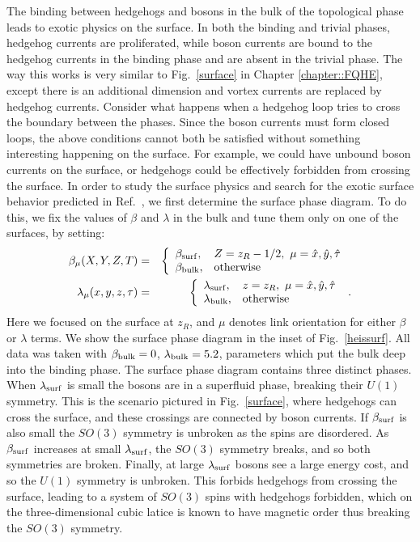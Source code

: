 The binding between hedgehogs and bosons in the bulk of the topological phase leads to exotic physics on the surface. In both the binding and trivial phases, hedgehog currents are proliferated, while boson currents are bound to the hedgehog currents in the binding phase and are absent in the trivial phase. The way this works is very similar to Fig.~\ref{surface} in Chapter \ref{chapter::FQHE}, except there is an additional dimension and vortex currents are replaced by hedgehog currents. Consider what happens when a hedgehog loop tries to cross the boundary between the phases. Since the boson currents must form closed loops, the above conditions cannot both be satisfied without something interesting happening on the surface. For example, we could have unbound boson currents on the surface, or hedgehogs could be effectively forbidden from crossing the surface.
In order to study the surface physics and search for the exotic surface behavior predicted in Ref.~\cite{SenthilVishwanath}, we first determine the surface phase diagram.
To do this, we fix the values of $\beta$ and $\lambda$ in the bulk and tune them only on one of the surfaces, by setting:
\begin{eqnarray}
\beta_\mu(X,Y,Z,T) &=&
\left\{
\begin{array}{ll}
\beta_{\rm surf}, & Z = z_R - 1/2, ~\mu=\hat{x},\hat{y},\hat{\tau}\\
\beta_{\rm bulk}, & {\rm otherwise}
\end{array}\right. ~
\label{bulkvsurf} \\
\lambda_\mu(x,y,z,\tau) &=&
\left\{
\begin{array}{ll}
\lambda_{\rm surf}, & z = z_R, ~\mu=\hat{x},\hat{y},\hat{\tau}\\
\lambda_{\rm bulk}, & {\rm otherwise }
\end{array}\right. ~.
\end{eqnarray}
Here we focused on the surface at $z_R$, and $\mu$ denotes link orientation for either $\beta$ or $\lambda$ terms.  We show the surface phase diagram in the inset of Fig.~\ref{heissurf}.  All data was taken with $\beta_{\rm bulk}=0$, $\lambda_{\rm bulk}=5.2$, parameters which put the bulk deep into the binding phase.  The surface phase diagram contains three distinct phases. When $\lambda_{\rm surf}$ is small the bosons are in a superfluid phase, breaking their $U(1)$ symmetry. This is the scenario pictured in Fig.~\ref{surface}, where hedgehogs can cross the surface, and these crossings are connected by boson currents. If $\beta_{\rm surf}$ is also small the $SO(3)$ symmetry is unbroken as the spins are disordered. As $\beta_{\rm surf}$ increases at small $\lambda_{\rm surf}$, the $SO(3)$ symmetry breaks, and so both symmetries are broken. Finally, at large $\lambda_{\rm surf}$ bosons see a large energy cost, and so the $U(1)$ symmetry is unbroken. This forbids hedgehogs from crossing the surface, leading to a system of $SO(3)$ spins with hedgehogs forbidden, which on the three-dimensional cubic latice is known to have magnetic order thus breaking the $SO(3)$ symmetry.\cite{LauDasgupta, LesikAshvin} 



